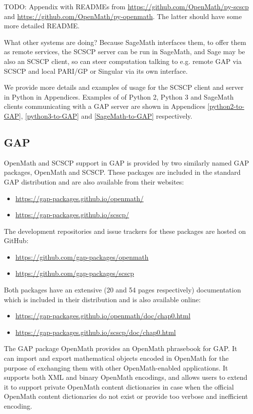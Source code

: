 \documentclass{deliverablereport}
\begin{document}
TODO: Appendix with READMEs from \url{https://github.com/OpenMath/py-scscp}
and \url{https://github.com/OpenMath/py-openmath}. The latter should have
some more detailed README.

What other systems are doing? Because SageMath interfaces them, to offer them
as remote services, the SCSCP server can be run in SageMath, and Sage may be
also an SCSCP client, so can steer computation talking to e.g. remote GAP 
via SCSCP and local PARI/GP or Singular via its own interface.

We provide more details and examples of usage for the SCSCP client and server in
Python in Appendices. Examples of of Python 2, Python 3 and SageMath clients 
communicating with a GAP server are shown in Appendices \ref{python2-to-GAP},
\ref{python3-to-GAP} and \ref{SageMath-to-GAP} respectively.


\subsection{GAP}

OpenMath and SCSCP support in GAP is provided by two similarly named GAP packages, 
{\sf OpenMath} and {\sf SCSCP}. These packages are included in the 
standard GAP distribution and are also available from their 
websites:
\begin{itemize}
\item
\url{https://gap-packages.github.io/openmath/}
\item
\url{https://gap-packages.github.io/scscp/}
\end{itemize}
The development repositories and issue trackers for these packages are hosted on GitHub:
\begin{itemize}
\item
\url{https://github.com/gap-packages/openmath}
\item
\url{https://github.com/gap-packages/scscp}
\end{itemize}
Both packages have an extensive (20 and 54 pages respectively) documentation 
which is included in their distribution and is also available online:
\begin{itemize}
\item
\url{https://gap-packages.github.io/openmath/doc/chap0.html}
\item
\url{https://gap-packages.github.io/scscp/doc/chap0.html}
\end{itemize}

The GAP package OpenMath provides an OpenMath phrasebook for GAP.
It can import and export mathematical objects encoded in OpenMath
for the purpose of exchanging them with other OpenMath-enabled 
applications. It supports both XML and binary OpenMath encodings, 
and allows users to extend it to support private OpenMath content
dictionaries in case when the official OpenMath content dictionaries
do not exist or provide too verbose and inefficient encoding.
\end{document}
